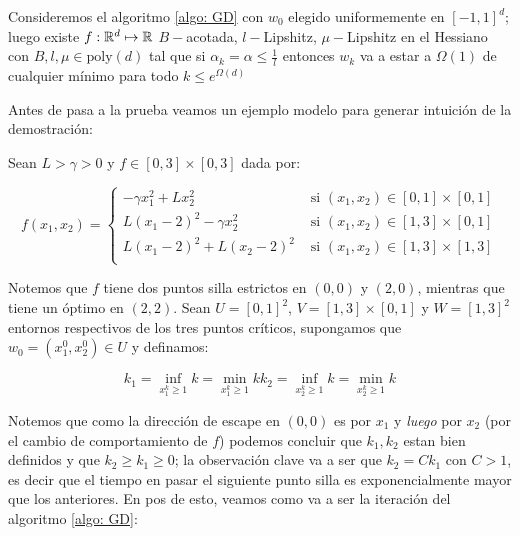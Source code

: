 
\begin{theorem}
	Consideremos el algoritmo \ref{algo: GD} con $w_0$ elegido uniformemente en $[-1,1]^d$; luego existe $f : {\mathbb{R}}^d \mapsto {\mathbb{R}}$ $B-$acotada, $l-$Lipshitz, $\mu-$Lipshitz en el Hessiano con $B,l,\mu \in \text{poly}(d)$ tal que si $\alpha_k = \alpha \leq \frac{1}{l}$ entonces $w_k$ va a estar a $\Omega(1)$ de cualquier m\'inimo para todo $k \leq e^{\Omega(d)}$
\end{theorem}

Antes de pasa a la prueba veamos un ejemplo modelo para generar intuici\'on de la demostraci\'on:

\begin{remark}
	Sean $L > \gamma > 0$ y $f \in [0,3] \times [0,3]$ dada por:
	
	\begin{equation}
		f(x_1, x_2) = \left\lbrace \begin{array}{cc}
		- \gamma x_1^2 + Lx_2^2 & \text{ si } (x_1,x_2) \in [0,1] \times [0,1] \\
		L \left(x_1 - 2\right)^2 - \gamma x_2^2 & \text{ si } (x_1,x_2) \in [1,3] \times [0,1] \\
		L \left(x_1 - 2\right)^2 + L \left(x_2 - 2\right)^2 & \text{ si } (x_1,x_2) \in [1,3] \times [1,3] \\
		\end{array} \right.
	\end{equation}
	
	Notemos que $f$ tiene dos puntos silla estrictos en $(0,0)$ y $(2,0)$, mientras que tiene un \'optimo en $(2,2)$. Sean $U = [0,1]^2$, $V= [1,3] \times [0,1]$ y $W = [1,3]^2$ entornos respectivos de los tres puntos cr\'iticos, supongamos que $w_0 = \left(x^0_1, x^0_2\right) \in U$ y definamos:
	
	\begin{subequations}
		\begin{equation*}
			k_1 = \inf\limits_{x^k_1 \geq 1}{k} = \min\limits_{x^k_1 \geq 1}{k}
		\end{equation*}
		\begin{equation*}
		k_2 = \inf\limits_{x^k_2 \geq 1}{k} = \min\limits_{x^k_2 \geq 1}{k}
		\end{equation*}
	\end{subequations}
	
	Notemos que como la direcci\'on de escape en $(0,0)$ es por $x_1$ y \textit{luego} por $x_2$ (por el cambio de comportamiento de $f$) podemos concluir que $k_1,k_2$ estan bien definidos y que $k_2 \geq k_1 \geq 0$; la observaci\'on clave va a ser que $k_2 = Ck_1$ con $C>1$, es decir que el tiempo en pasar el siguiente punto silla es exponencialmente mayor que los anteriores. En pos de esto, veamos como va a ser la iteraci\'on del algoritmo \ref{algo: GD}:
	

\end{remark}
